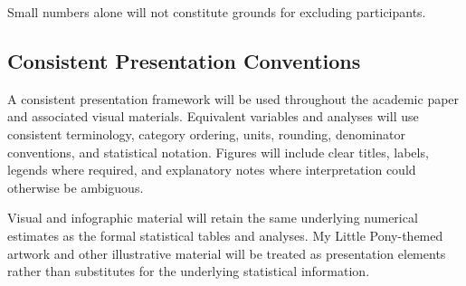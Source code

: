 Small numbers alone will not constitute grounds for excluding participants.


\subsection{Consistent Presentation Conventions}

A consistent presentation framework will be used throughout the academic paper and associated visual materials. Equivalent variables and analyses will use consistent terminology, category ordering, units, rounding, denominator conventions, and statistical notation. Figures will include clear titles, labels, legends where required, and explanatory notes where interpretation could otherwise be ambiguous.

Visual and infographic material will retain the same underlying numerical estimates as the formal statistical tables and analyses. My Little Pony-themed artwork and other illustrative material will be treated as presentation elements rather than substitutes for the underlying statistical information.

